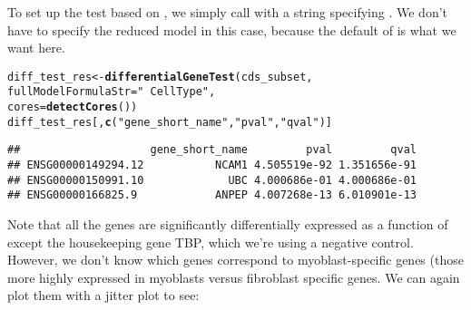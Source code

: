 \documentclass[10pt,oneside]{article}\usepackage[]{graphicx}\usepackage[]{color}
\makeatletter
\newcommand{\hlstr}[1]{\textcolor[rgb]{0.192,0.494,0.8}{#1}}%
\newcommand{\hlstd}[1]{\textcolor[rgb]{0.345,0.345,0.345}{#1}}%
\newcommand{\hlkwb}[1]{\textcolor[rgb]{0.69,0.353,0.396}{#1}}%
\newcommand{\hlkwc}[1]{\textcolor[rgb]{0.333,0.667,0.333}{#1}}%
\newcommand{\hlkwd}[1]{\textcolor[rgb]{0.737,0.353,0.396}{\textbf{#1}}}%
\newenvironment{kframe}{%
 \def\at@end@of@kframe{}%
 \ifinner\ifhmode%
  \def\at@end@of@kframe{\end{minipage}}%
  \begin{minipage}{\columnwidth}%
 \fi\fi%
 \def\FrameCommand##1{\hskip\@totalleftmargin \hskip-\fboxsep
 \colorbox{shadecolor}{##1}\hskip-\fboxsep
     \hskip-\linewidth \hskip-\@totalleftmargin \hskip\columnwidth}%
 \MakeFramed {\advance\hsize-\width
   \@totalleftmargin\z@ \linewidth\hsize
   \@setminipage}}%
 {\par\unskip\endMakeFramed%
 \at@end@of@kframe}
\newenvironment{knitrout}{}{} %
\makeatother
\begin{document}
To set up the test based on , we simply call  with a string specifying .  We don't have to specify the reduced model in this case, because the default of  is what we want here.

\begin{knitrout}
\color{fgcolor}\begin{kframe}
\begin{alltt}
\hlstd{diff_test_res} \hlkwb{<-} \hlkwd{differentialGeneTest}\hlstd{(cds_subset,}
                                      \hlkwc{fullModelFormulaStr}\hlstd{=}\hlstr{"~CellType"}\hlstd{,}
                                      \hlkwc{cores} \hlstd{=} \hlkwd{detectCores}\hlstd{())}
\hlstd{diff_test_res[,}\hlkwd{c}\hlstd{(}\hlstr{"gene_short_name"}\hlstd{,} \hlstr{"pval"}\hlstd{,} \hlstr{"qval"}\hlstd{)]}
\end{alltt}
\begin{verbatim}
##                    gene_short_name         pval         qval
## ENSG00000149294.12           NCAM1 4.505519e-92 1.351656e-91
## ENSG00000150991.10             UBC 4.000686e-01 4.000686e-01
## ENSG00000166825.9            ANPEP 4.007268e-13 6.010901e-13
\end{verbatim}
\end{kframe}
\end{knitrout}



Note that all the genes are significantly differentially expressed as a function of  except the housekeeping gene TBP, which we're using a negative control.  However, we don't know which genes correspond to myoblast-specific genes (those more highly expressed in myoblasts versus fibroblast specific genes.  We can again plot them with a jitter plot to see:
\end{document}
